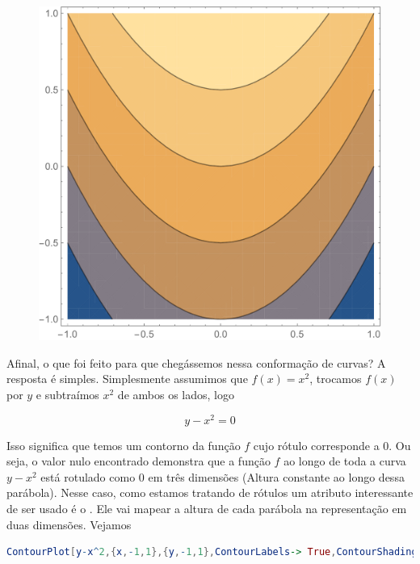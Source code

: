 \documentclass[a4paper, 12pt]{article}
\begin{document}
\begin{figure}[!h]
	\centering
	\includegraphics[scale=.27]{images/ContourPlot}
\end{figure}

	Afinal, o que foi feito para que chegássemos nessa conformação de curvas? A resposta é simples. Simplesmente assumimos que $f(x)=x^{2}$, trocamos $f(x)$ por $y$ e subtraímos $x^{2}$ de ambos os lados, logo
	
	\begin{equation}
		y-x^{2}=0
	\end{equation}
	
	Isso significa que temos um contorno da função $f$ cujo rótulo corresponde a 0. Ou seja, o valor nulo encontrado demonstra que a função $f$ ao longo de toda a curva $y-x^{2}$ está rotulado como 0 em três dimensões (Altura constante ao longo dessa parábola). Nesse caso, como estamos tratando de rótulos um atributo interessante de ser usado é o . Ele vai mapear a altura de cada parábola na representação em duas dimensões. Vejamos
	
\begin{lstlisting}[language=Mathematica]
ContourPlot[y-x^2,{x,-1,1},{y,-1,1},ContourLabels-> True,ContourShading->False]
\end{lstlisting}
\end{document}

